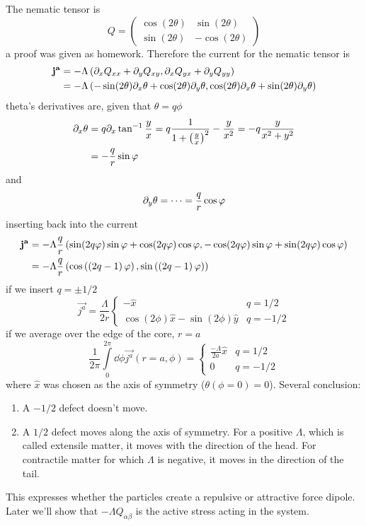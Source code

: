 The nematic tensor is
\begin{equation}
    Q = \begin{pmatrix}
        \cos(2\theta)&\sin(2\theta)\\\sin(2\theta)&-\cos(2\theta)
    \end{pmatrix}
\end{equation}
a proof was given as homework. Therefore the current for the nematic tensor is
\begin{align}
    \mathbf{j^a} &= -\Lambda\left(\partial_x Q_{xx}+\partial_y Q_{xy}, \partial_x Q_{yx}+\partial_y Q_{yy}\right) \\
    &= -\Lambda \left(-\sin(2\theta)\partial_x\theta + \cos(2\theta)\partial_y\theta, \cos(2\theta)\partial_x\theta+\sin(2\theta)\partial_y\theta\right)
\end{align}
theta's derivatives are, given that \(\theta = q\phi \)
\begin{align}
    \partial_x\theta &= q\partial_x\tan^{-1}\frac{y}{x}= q\frac{1}{1+\left(\frac{y}{x}\right)^2}-\frac{y}{x^2} = -q\frac{y}{x^2+y^2} \\
    &= -\frac{q}{r}\sin\varphi
\end{align}
and
\begin{align}
    \partial_y\theta = \cdots = \frac{q}{r}\cos\varphi
\end{align}
inserting back into the current
\begin{align}
    \mathbf{j^a} &= -\Lambda\frac{q}{r}\left(\sin(2q\varphi)\sin\varphi+\cos(2q\varphi)\cos\varphi, - \cos(2q\varphi)\sin\varphi+\sin(2q\varphi)\cos\varphi\right)\\
    &= -\Lambda\frac{q}{r}\left(\cos\left(\left(2q-1\right)\varphi\right),\sin\left(\left(2q-1\right)\varphi\right)\right)
\end{align}
if we insert \(q=\pm 1/2 \)
\begin{equation}
    \vec{j^a} = \frac{\Lambda}{2r} \begin{cases}
        -\hat{x} & q=1/2 \\
        \cos(2\phi)\hat{x} - \sin(2\phi)\hat{y} & q=-1/2
    \end{cases}
\end{equation}
if we average over the edge of the core, \(r=a\)
\begin{equation}
    \frac{1}{2\pi}\int\limits_0^{2\pi}\dd\phi \vec{j^a}(r=a,\phi) = \begin{cases}
        \frac{-\Lambda}{2a}\hat{x} & q=1/2 \\
        0 & q=-1/2
    \end{cases}
\end{equation}
where \(\hat{x}\) was chosen as the axis of symmetry (\(\theta(\phi=0)=0\)). Several conclusion:
\begin{enumerate}
    \item A \(-1/2\) defect doesn't move.
    \item A \(1/2\) defect moves along the axis of symmetry. For a positive \(\Lambda \), which is called extensile matter, it moves with the direction of the head. For contractile matter for which \(\Lambda\) is negative, it moves in the direction of the tail.
\end{enumerate}
This expresses whether the particles create a repulsive or attractive force dipole. Later we'll show that \(-\Lambda Q_{\alpha\beta}\) is the active stress acting in the system.
